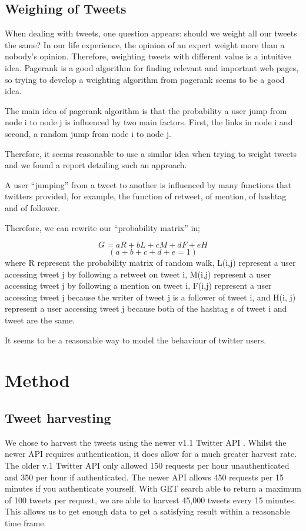 \documentclass[a4paper]{article}
\begin{document}
\subsection{Weighing of Tweets}
When dealing with tweets, one question appears: should we weight all our tweets the same? In our life experience, the opinion of an expert weight more than a nobody’s opinion. Therefore, weighting tweets with different value is a intuitive idea. Pagerank is a good algorithm for finding relevant and important web pages, so trying to develop a weighting algorithm from pagerank seems to be a good idea.

The main idea of pagerank algorithm is that the probability a user jump from node i to node j is influenced by two main factors. First, the links in node i and second, a random jump from node i to node j.

Therefore, it seems reasonable to use a similar idea when trying to weight tweets and we found a report \cite{weigh2} detailing such an approach.

A user “jumping” from a tweet to another is influenced by many functions that twitters provided, for example, the function of retweet, of mention, of hashtag and of follower.

Therefore, we can rewrite our “probability matrix” in;

\[G = aR + bL + cM + dF + eH\]
\[(a + b + c + d + e = 1)\]
where R represent the probability matrix of random walk, L(i,j) represent a user accessing tweet j by following a retweet on tweet i, M(i,j) represent a user accessing tweet j by following a mention on tweet i, F(i,j) represent a user accessing  tweet j because the writer of tweet j is a follower of tweet i, and H(i, j) represent a user accessing tweet j because both of the hashtag s of tweet i and tweet are the same.

It seems to be a reasonable way to model the behaviour of twitter users.

\section{Method}
\subsection{Tweet harvesting}
We chose to harvest the tweets using the newer v1.1 Twitter API \cite{tw_api}. Whilst the newer API requires authentication, it does allow for a much greater harvest rate. The older v.1 Twitter API \cite{tw_api_1_0} only allowed 150 requests per hour unauthenticated and 350 per hour if authenticated. The newer API allows 450 requests per 15 minutes if you authenticate yourself. With GET search able to return a maximum of 100 tweets per request, we are able to harvest 45,000 tweets every 15 minutes. This allows us to get enough data to get a satisfying result within a reasonable time frame.
\end{document}
